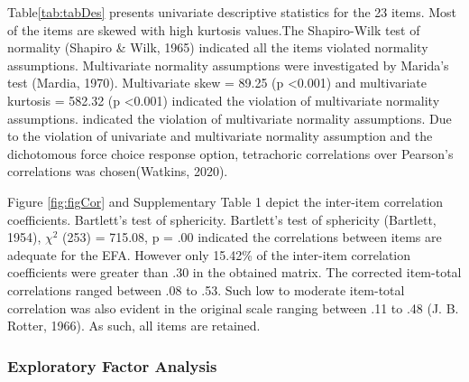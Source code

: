 \documentclass[
  man]{apa6}
\begin{document}
\begin{table}[tbp]
\begin{center}
\begin{threeparttable}
\end{threeparttable}
\end{center}

\end{table}

Table\ref{tab:tabDes} presents univariate descriptive statistics for the 23 items. Most of the items are skewed with high kurtosis values.The Shapiro-Wilk test of normality (Shapiro \& Wilk, 1965) indicated all the items violated normality assumptions. Multivariate normality assumptions were investigated by Marida's test (Mardia, 1970). Multivariate skew = 89.25 (p \textless0.001) and multivariate kurtosis = 582.32 (p \textless0.001) indicated the violation of multivariate normality assumptions. indicated the violation of multivariate normality assumptions. Due to the violation of univariate and multivariate normality assumption and the dichotomous force choice response option, tetrachoric correlations over Pearson's correlations was chosen(Watkins, 2020).

Figure \ref{fig:figCor} and Supplementary Table 1 depict the inter-item correlation coefficients. Bartlett's test of sphericity. Bartlett's test of sphericity (Bartlett, 1954), \(\chi^2\) (253) = 715.08, p = .00 indicated the correlations between items are adequate for the EFA. However only 15.42\% of the inter-item correlation coefficients were greater than .30 in the obtained matrix. The corrected item-total correlations ranged between .08 to .53. Such low to moderate item-total correlation was also evident in the original scale ranging between .11 to .48 (J. B. Rotter, 1966). As such, all items are retained.

\hypertarget{exploratory-factor-analysis}{%
\subsubsection{Exploratory Factor Analysis}\label{exploratory-factor-analysis}}
\end{document}
